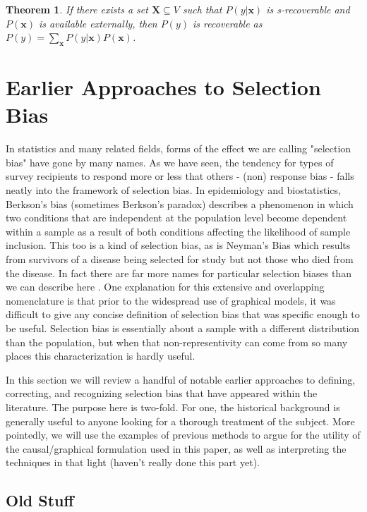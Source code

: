 \documentclass[12pt,twoside]{reedthesis}
\newtheorem{theorem}{Theorem}
\theoremstyle{definition}
\begin{document}
\begin{theorem}
If there exists a set $\mathbf{X} \subseteq V$ such that $P(y|\mathbf{x})$ is s-recoverable and $P(\mathbf{x})$ is available externally, then $P(y)$ is recoverable as $P(y) = \sum_{\mathbf{x}} P(y|\mathbf{x})P(\mathbf{x})$.
\end{theorem}


\chapter{Earlier Approaches to Selection Bias}

In statistics and many related fields, forms of the effect we are calling "selection bias" have gone by many names. As we have seen,  the tendency for types of survey recipients to respond more or less that others - (non) response bias - falls neatly into the framework of selection bias. In epidemiology and biostatistics, Berkson's bias (sometimes Berkson's paradox) describes a phenomenon in which two conditions that are independent at the population level become dependent within a sample as a result of both conditions affecting the likelihood of sample inclusion. This too is a kind of selection bias, as is Neyman's Bias which results from survivors of a disease being selected for study but not those who died from the disease. In fact there are far more names for particular selection biases than we can describe here \citep{Delgado_2008}. One explanation for this extensive and overlapping nomenclature is that prior to the widespread use of graphical models, it was difficult to give any concise definition of selection bias that was specific enough to be useful. Selection bias is essentially about a sample with a different distribution than the population, but when that non-representivity can come from so many places this characterization is hardly useful.

In this section we will review a handful of notable earlier approaches to defining, correcting, and recognizing selection bias that have appeared within the literature. The purpose here is two-fold. For one, the historical background is generally useful to anyone looking for a thorough treatment of the subject. More pointedly, we will use the examples of previous methods to argue for the utility of the causal/graphical formulation used in this paper, as well as interpreting the techniques in that light (haven't really done this part yet).

\section{Old Stuff}
\end{document}

